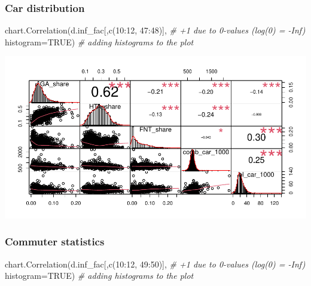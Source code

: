 \documentclass[
]{article}
\newenvironment{Shaded}{\begin{snugshade}}{\end{snugshade}}
\newcommand{\AttributeTok}[1]{\textcolor[rgb]{0.77,0.63,0.00}{#1}}
\newcommand{\CommentTok}[1]{\textcolor[rgb]{0.56,0.35,0.01}{\textit{#1}}}
\newcommand{\ConstantTok}[1]{\textcolor[rgb]{0.00,0.00,0.00}{#1}}
\newcommand{\DecValTok}[1]{\textcolor[rgb]{0.00,0.00,0.81}{#1}}
\newcommand{\FunctionTok}[1]{\textcolor[rgb]{0.00,0.00,0.00}{#1}}
\newcommand{\NormalTok}[1]{#1}
\newcommand{\SpecialCharTok}[1]{\textcolor[rgb]{0.00,0.00,0.00}{#1}}
\begin{document}
\hypertarget{car-distribution}{%
\subsubsection{Car distribution}\label{car-distribution}}

\begin{Shaded}
\begin{Highlighting}[]
\FunctionTok{chart.Correlation}\NormalTok{(d.inf\_fac[,}\FunctionTok{c}\NormalTok{(}\DecValTok{10}\SpecialCharTok{:}\DecValTok{12}\NormalTok{, }\DecValTok{47}\SpecialCharTok{:}\DecValTok{48}\NormalTok{)], }\CommentTok{\# +1 due to 0{-}values (log(0) = {-}Inf)}
                  \AttributeTok{histogram=}\ConstantTok{TRUE}\NormalTok{) }\CommentTok{\# adding histograms to the plot}
\end{Highlighting}
\end{Shaded}

\includegraphics{Lin_Mod_Clus_Analysis_files/figure-latex/unnamed-chunk-15-1.pdf}

\hypertarget{commuter-statistics}{%
\subsubsection{Commuter statistics}\label{commuter-statistics}}

\begin{Shaded}
\begin{Highlighting}[]
\FunctionTok{chart.Correlation}\NormalTok{(d.inf\_fac[,}\FunctionTok{c}\NormalTok{(}\DecValTok{10}\SpecialCharTok{:}\DecValTok{12}\NormalTok{, }\DecValTok{49}\SpecialCharTok{:}\DecValTok{50}\NormalTok{)], }\CommentTok{\# +1 due to 0{-}values (log(0) = {-}Inf)}
                  \AttributeTok{histogram=}\ConstantTok{TRUE}\NormalTok{) }\CommentTok{\# adding histograms to the plot}
\end{Highlighting}
\end{Shaded}
\end{document}
